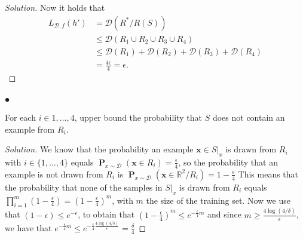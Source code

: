 \documentclass[10pt, a4paper, twoside]{amsart}
\newcommand{\R}{\ensuremath{\mathbb{R}}}
\renewcommand{\P}{\operatorname*{\ensuremath{\mathbf{P}}}}
\newenvironment{solution}
               {\let\oldqedsymbol=\qedsymbol
                \renewcommand{\qedsymbol}{$\blacktriangleleft$}
                \begin{proof}[Solution]}
               {\end{proof}
                \renewcommand{\qedsymbol}{\oldqedsymbol}}
\begin{document}
\begin{solution}
  

  Now it holds that
\begin{align*}
  L_{\mathcal{D},f}(h') & = \mathcal{D}( R^*/R(S)) \\
                      & \leq \mathcal{D}(R_1 \cup R_2 \cup R_3 \cup R_4) \\
                      & \leq \mathcal{D}(R_1) + \mathcal{D}(R_2) + \mathcal{D}(R_3) + \mathcal{D}(R_4)\\
 & = \frac{4\epsilon}{4} = \epsilon.
\end{align*}  
\end{solution}

\subsubsection*{$\bullet$}
For each $i \in {1,\ldots,4}$, upper bound the probability that $S$ does not contain an example from $R_i$.

\begin{solution}
  We know that the probability an example $\mathbf{x} \in S|_x$ is drawn from $R_i$ with $i \in \{1,\ldots, 4\}$ equals $\P_{x\sim\mathcal{D}}(\mathbf{x}\in R_i) = \frac{\epsilon}{4}$, so the probability that an example is not drawn from $R_i$ is $\P_{x\sim\mathcal{D}}(\mathbf{x}\in \R^2/R_i) = 1-\frac{\epsilon}{4}$ This means that the probability that none of the samples in $S|_x$ is drawn from $R_i$ equals $\prod_{i = 1}^m(1-\frac{\epsilon}{4}) = (1-\frac{\epsilon}{4})^m$, with $m$ the size of the training set. Now we use that $(1-\epsilon)\leq e^{-\epsilon}$, to obtain that $(1-\frac{\epsilon}{4})^m \leq e^{- \frac{\epsilon}{4}m}$ and since $m \geq \frac{4\log (4/\delta)}{\epsilon}$, we have that $e^{- \frac{\epsilon}{4}m} \leq e^{-\frac{\epsilon}{4}\frac{4\log (4/\delta)}{\epsilon}}= \frac{\delta}{4}$
\end{solution}
\end{document}
